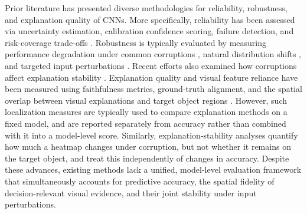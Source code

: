 \documentclass[a4paper,fleqn]{cas-dc}
\begin{document}
	Prior literature has presented diverse methodologies for reliability, robustness, and explanation quality of CNNs. 
	More specifically, reliability has been assessed via uncertainty estimation, calibration confidence scoring,  failure detection, and risk-coverage trade-offs \cite{ref14, ref15}. 
	Robustness is typically evaluated by measuring performance degradation under common corruptions \cite{ref16, ref17}, natural distribution shifts \cite{ref18}, and targeted input perturbations \cite{ref19, ref20}. 
	Recent efforts also examined how corruptions affect explanation stability \cite{ref21}. 
	Explanation quality and visual feature reliance have been measured using faithfulness metrics, ground-truth alignment, and the spatial overlap between visual explanations and target object regions \cite{ref22, ref23, ref24}.
	However, such localization measures are typically used to compare explanation methods on a fixed model, and are reported separately from accuracy rather than combined with it into a model-level score. 
	Similarly, explanation-stability analyses \cite{ref21} quantify how much a heatmap changes under corruption, but not whether it remains on the target object, and treat this independently of changes in accuracy. 
	Despite these advances, %
	existing methods lack a unified, model-level evaluation framework that simultaneously accounts for predictive accuracy, the spatial fidelity of decision-relevant visual evidence, and their joint stability under input perturbations.
		
\end{document}
